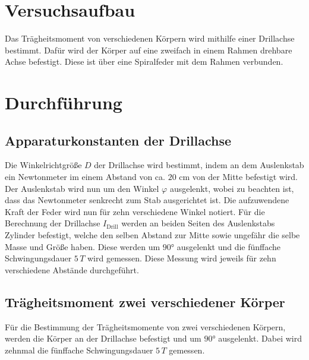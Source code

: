
\section{Versuchsaufbau}
\label{sec:Versuchsaufbau}
Das Trägheitsmoment von verschiedenen Körpern wird mithilfe einer
Drillachse bestimmt. Dafür wird der Körper auf eine zweifach in einem Rahmen 
drehbare Achse befestigt. Diese ist über eine Spiralfeder mit dem Rahmen 
verbunden. %
%
\section{Durchführung}
\label{sec:Durchführung}
\subsection{Apparaturkonstanten der Drillachse}
\label{sec:Apparturkonstanten}
Die Winkelrichtgröße $D$ der Drillachse wird bestimmt, indem an dem Auslenkstab
ein Newtonmeter im einem Abstand von ca. $20\,\,\unit{\centi\meter}$ von der Mitte 
befestigt wird. Der Auslenkstab wird nun um den Winkel $\varphi$ ausgelenkt, wobei zu beachten ist,
dass das Newtonmeter senkrecht zum Stab ausgerichtet ist. Die aufzuwendene Kraft der Feder wird nun
für zehn verschiedene Winkel notiert. Für die Berechnung der Drillachse $I_{\text{Drill}}$ werden an beiden Seiten des 
Auslenkstabs Zylinder befestigt, welche den selben Abstand zur Mitte sowie ungefähr die selbe Masse und Größe
haben. Diese werden um $90°$ ausgelenkt und die fünffache Schwingungsdauer $5\,T$ wird gemessen. Diese Messung
wird jeweils für zehn verschiedene Abstände durchgeführt.
%
\subsection{Trägheitsmoment zwei verschiedener Körper}
\label{sec:TragheitZweiKörper}
Für die Bestimmung der Trägheitsmomente von zwei verschiedenen Körpern, werden die Körper an der Drillachse
befestigt und um $90°$ ausgelenkt. Dabei wird zehnmal die fünffache Schwingungsdauer $5\,T$ gemessen. %
